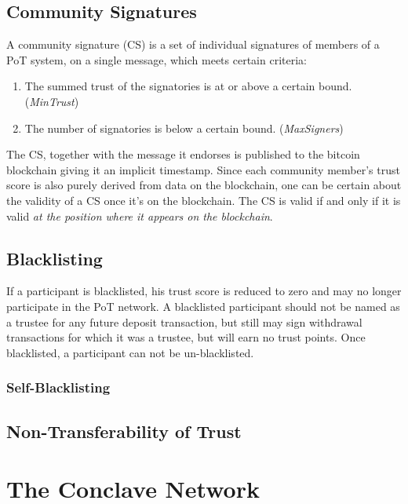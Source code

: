 \documentclass{article}
\begin{document}
\subsection{Community Signatures}

A community signature (CS) is a set of individual signatures of members of a PoT system, on a single message, which meets certain criteria:

\begin{enumerate}
	\item The summed trust of the signatories is at or above a certain bound. (\textit{MinTrust})
	\item The number of signatories is below a certain bound. (\textit{MaxSigners})
\end{enumerate}

The CS, together with the message it endorses is published to the bitcoin blockchain giving it an implicit timestamp. Since each community member's trust score is also purely derived from data on the blockchain, one can be certain about the validity of a CS once it's on the blockchain. The CS is valid if and only if it is valid \textit{at the position where it appears on the blockchain}.\\

\subsection{Blacklisting}

If a participant is blacklisted, his trust score is reduced to zero and may no longer participate in the PoT network. A blacklisted participant should not be named as a trustee for any future deposit transaction, but still may sign withdrawal transactions for which it was a trustee, but will earn no trust points. Once blacklisted, a participant can not be un-blacklisted.

\subsubsection{Self-Blacklisting}

\subsection{Non-Transferability of Trust}

\section{The Conclave Network}
\end{document}
